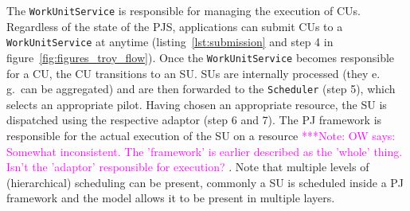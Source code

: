 \documentclass[conference,final]{IEEEtran}
\newcommand{\note}[1]{ {\textcolor{magenta} { ***Note: #1 }}}
\newcommand{\note}[1]{}
\newcommand{\cu}{CU\xspace}
\newcommand{\cus}{CUs\xspace}
\begin{document}

The \texttt{WorkUnitService} is responsible for managing the execution of \cus.
Regardless of the state of the PJS, applications can submit \cus to a
\texttt{WorkUnitService} at anytime (listing~\ref{lst:submission} and step 4 in
figure~\ref{fig:figures_troy_flow}). Once the \texttt{WorkUnitService} becomes
responsible for a \cu, the \cu  transitions to an SU. SUs are internally processed
(they e.\,g.\ can be aggregated) and are then forwarded to the
\texttt{Scheduler} (step 5), which selects an appropriate pilot. Having chosen
an appropriate resource, the SU is dispatched using the respective adaptor (step
6 and 7). The PJ framework is responsible for the actual execution of the SU on
a resource
\note{OW says: Somewhat inconsistent. The 'framework' is earlier described as 
the 'whole' thing. Isn't the 'adaptor' responsible for execution?}. 
Note that multiple levels of (hierarchical) scheduling can be
present, commonly a SU is scheduled inside a PJ framework and the model allows
it to be present in multiple layers.






\end{document}
